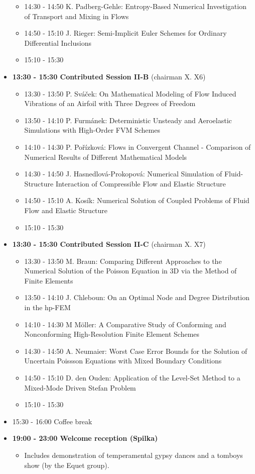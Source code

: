 \documentclass[10pt, A4]{article}%
\begin{document}
\begin{itemize}
\begin{itemize}
    \item 14:30 - 14:50 K. Padberg-Gehle: Entropy-Based Numerical Investigation of Transport     and Mixing in Flows
    \item 14:50 - 15:10 J. Rieger: Semi-Implicit Euler Schemes for Ordinary Differential Inclusions
    \item 15:10 - 15:30
  \end{itemize}
  \item {\bf 13:30 - 15:30 Contributed Session II-B} (chairman X. X6) 
  \begin{itemize}
    \item 13:30 - 13:50 P. Sv\'{a}\v{c}ek: On Mathematical Modeling of Flow Induced Vibrations of an Airfoil with Three Degrees of Freedom
    \item 13:50 - 14:10 P. Furm\'{a}nek: Deterministic Unsteady and Aeroelastic Simulations with High-Order FVM Schemes
    \item 14:10 - 14:30 P. Po\v{r}\'{i}zkov\'{a}: Flows in Convergent Channel - Comparison of Numerical Results of Different Mathematical Models
    \item 14:30 - 14:50 J. Hasnedlov\'{a}-Prokopov\'{a}: Numerical Simulation of Fluid-Structure Interaction of Compressible Flow and Elastic Structure
    \item 14:50 - 15:10 A. Kos\'{i}k: Numerical Solution of Coupled Problems of Fluid Flow and Elastic Structure
    \item 15:10 - 15:30
  \end{itemize}
    \item {\bf 13:30 - 15:30 Contributed Session II-C} (chairman X. X7) 
  \begin{itemize}
    \item 13:30 - 13:50 M. Braun: Comparing Different Approaches to the Numerical Solution of the Poisson Equation in 3D via the Method of Finite Elements
    \item 13:50 - 14:10 J. Chleboun: On an Optimal Node and Degree Distribution in the hp-FEM
    \item 14:10 - 14:30 M M\"{o}ller: A Comparative Study of Conforming and Nonconforming
High-Resolution Finite Element Schemes
    \item 14:30 - 14:50 A. Neumaier: Worst Case Error Bounds for the Solution of Uncertain Poissson Equations with Mixed Boundary Conditions
    \item 14:50 - 15:10 D. den Ouden: Application of the Level-Set Method to a Mixed-Mode Driven Stefan Problem
    \item 15:10 - 15:30
  \end{itemize}
  \item 15:30 - 16:00 Coffee break
  \item {\bf 19:00 - 23:00 Welcome reception (Spilka)} 
  \begin{itemize}
     \item Includes demonstration of temperamental gypsy dances and a tomboys show (by the Equet group).  
  \end{itemize}
\end{itemize}
\end{document}
